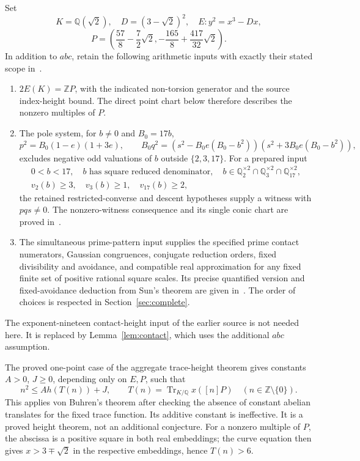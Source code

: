 \documentclass[11pt,a4paper]{article}
\newcommand{\Q}{\mathbb Q}\newcommand{\Z}{\mathbb Z}
\DeclareMathOperator{\Tr}{Tr}\DeclareMathOperator{\rad}{rad}
\begin{document}
Set
\[
 K=\Q(\sqrt2),\quad D=(3-\sqrt2)^2,\quad
 E:y^2=x^3-Dx,
\]
\[
 P=\left(\frac{57}{8}-\frac72\sqrt2,
                 -\frac{165}{8}+\frac{417}{32}\sqrt2\right).
\]
In addition to $abc$, retain the following arithmetic inputs with
exactly their stated scope in~\cite{Dependencies,Source27}.
\begin{enumerate}
\item $2E(K)=\Z P$, with the indicated non-torsion generator
and the source index-height bound. The direct point chart below
therefore describes the nonzero multiples of $P$.
\item The pole system, for $b\ne0$ and $B_0=17b$,
\[
 p^2=B_0(1-e)(1+3e),\qquad
 B_0q^2=(s^2-B_0e(B_0-b^2))(s^2+3B_0e(B_0-b^2)),
\]
excludes negative odd valuations of $b$ outside $\{2,3,17\}$.
For a prepared input
\begin{equation}\label{eq:prepared}
 \begin{gathered}
 0<b<17,\quad b\text{ has square reduced denominator},\quad
 b\in\Q_2^{\times2}\cap\Q_3^{\times2}\cap\Q_{17}^{\times2},\\
 v_2(b)\ge3,\quad v_3(b)\ge1,\quad v_{17}(b)\ge2,
 \end{gathered}
\end{equation}
the retained restricted-converse and descent hypotheses supply a
witness with $pqs\ne0$. The nonzero-witness consequence and its
single conic chart are proved in~\cite[Lemma~2]{Source27}.
\item The simultaneous prime-pattern input supplies the specified
prime contact numerators, Gaussian congruences, conjugate reduction
orders, fixed divisibility and avoidance, and compatible real
approximation for any fixed finite set of positive rational square
scales. Its precise quantified version and fixed-avoidance deduction
from Sun's theorem are given in~\cite{Dependencies}. The order of
choices is respected in Section~\ref{sec:complete}.
\end{enumerate}
The exponent-nineteen contact-height input of the earlier source is
not needed here. It is replaced by Lemma~\ref{lem:contact}, which
uses the additional $abc$ assumption.

The proved one-point case of the aggregate trace-height theorem
\cite{Trace} gives constants $A>0$, $J\ge0$, depending only on
$E,P$, such that
\begin{equation}\label{eq:traceheight}
 n^2\le A h(T(n))+J,\qquad
 T(n)=\Tr_{K/\Q}x([n]P)\quad(n\in\Z\setminus\{0\}).
\end{equation}
This applies von Buhren's theorem after checking the absence of
constant abelian translates for the fixed trace function. Its additive
constant is ineffective. It is a proved height theorem, not an
additional conjecture. For a nonzero multiple of $P$, the abscissa
is a positive square in both real embeddings; the curve equation
then gives $x>3\mp\sqrt2$ in the respective embeddings, hence
$T(n)>6$.
\end{document}

